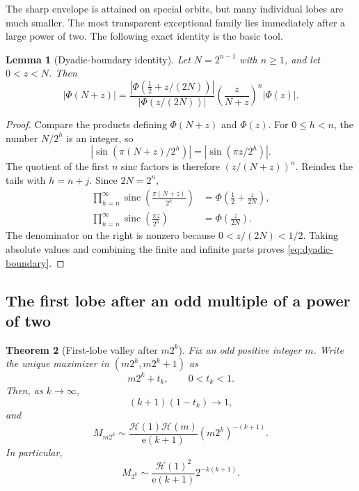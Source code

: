 \documentclass[11pt,oneside]{article}
\numberwithin{equation}{section}
\newtheorem{theorem}{Theorem}[section]
\newtheorem{lemma}[theorem]{Lemma}
\theoremstyle{definition}
\theoremstyle{remark}
\newcommand{\e}{\mathrm e}
\newcommand{\abs}[1]{\left|#1\right|}
\newcommand{\sinc}{\operatorname{sinc}}
\newcommand{\PhiUp}{\Phi}
\begin{document}
The sharp envelope is attained on special orbits, but many individual lobes are much
smaller.  The most transparent exceptional family lies immediately after a large power of
two.  The following exact identity is the basic tool.

\begin{lemma}[Dyadic-boundary identity]
\label{lem:dyadic-boundary}
Let \(N=2^{n-1}\) with \(n\ge1\), and let \(0<z<N\).  Then
\begin{equation}
 \abs{\PhiUp(N+z)}
 =\frac{\abs{\PhiUp(\tfrac12+z/(2N))}}
        {\abs{\PhiUp(z/(2N))}}
  \left(\frac{z}{N+z}\right)^n\abs{\PhiUp(z)}.
 \label{eq:dyadic-boundary}
\end{equation}
\end{lemma}

\begin{proof}
Compare the products defining \(\PhiUp(N+z)\) and \(\PhiUp(z)\).  For
\(0\le h<n\), the number \(N/2^h\) is an integer, so
\[
 \abs{\sin(\pi(N+z)/2^h)}
 =\abs{\sin(\pi z/2^h)}.
\]
The quotient of the first \(n\) sinc factors is therefore
\((z/(N+z))^n\).  Reindex the tails with \(h=n+j\).  Since \(2N=2^n\),
\begin{align*}
 \prod_{h=n}^{\infty}
 \sinc\!\left(\frac{\pi(N+z)}{2^h}\right)
 &=\PhiUp\!\left(\frac12+\frac{z}{2N}\right),\\
 \prod_{h=n}^{\infty}
 \sinc\!\left(\frac{\pi z}{2^h}\right)
 &=\PhiUp\!\left(\frac{z}{2N}\right).
\end{align*}
The denominator on the right is nonzero because \(0<z/(2N)<1/2\).  Taking absolute
values and combining the finite and infinite parts proves \eqref{eq:dyadic-boundary}.
\end{proof}

\subsection{The first lobe after an odd multiple of a power of two}

\begin{theorem}[First-lobe valley after \(m2^k\)]
\label{thm:odd-multiple-valley}
Fix an odd positive integer \(m\).  Write the unique maximizer in
\((m2^k,m2^k+1)\) as
\[
 m2^k+t_k,\qquad 0<t_k<1.
\]
Then, as \(k\to\infty\),
\begin{equation}
 (k+1)(1-t_k)\longrightarrow1,
 \label{eq:odd-multiple-location}
\end{equation}
and
\begin{equation}
 M_{m2^k}
 \sim
 \frac{\mathcal H(1)\mathcal H(m)}{\e(k+1)}
 (m2^k)^{-(k+1)}.
 \label{eq:odd-multiple-amplitude}
\end{equation}
In particular,
\begin{equation}
 M_{2^k}
 \sim\frac{\mathcal H(1)^2}{\e(k+1)}2^{-k(k+1)}.
 \label{eq:first-power-two-lobe}
\end{equation}
\end{theorem}
\end{document}
